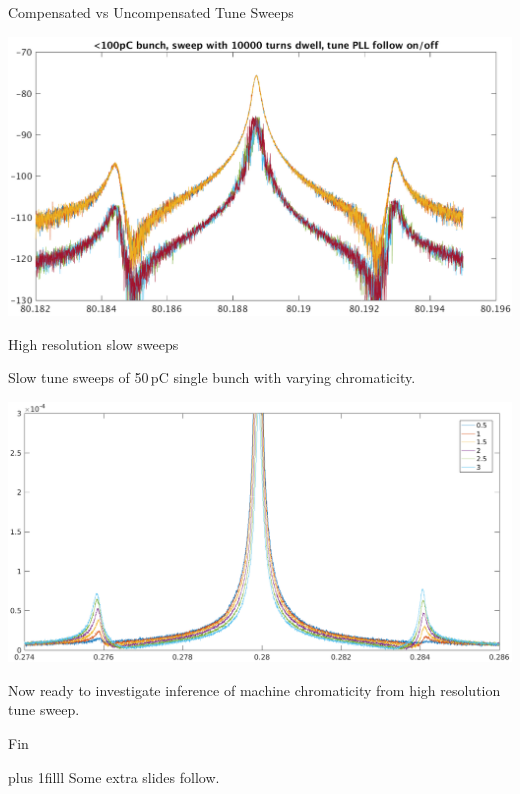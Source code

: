 \documentclass[xcolor=table]{beamer}
\begin{document}
%
\begin{frame}{Compensated vs Uncompensated Tune Sweeps}

\includegraphics[width=\linewidth]{PLL_small_bunch_sweep4.png}

\end{frame}


%
\begin{frame}{High resolution slow sweeps}

Slow tune sweeps of 50\,pC single bunch with varying chromaticity.

\includegraphics[width=\linewidth]{chro-scan.png}

Now ready to investigate inference of machine chromaticity from high resolution
tune sweep.

\end{frame}


%
\begin{frame}{Fin}

\vskip0pt plus 1filll
\footnotesize
Some extra slides follow.

\end{frame}
\end{document}
